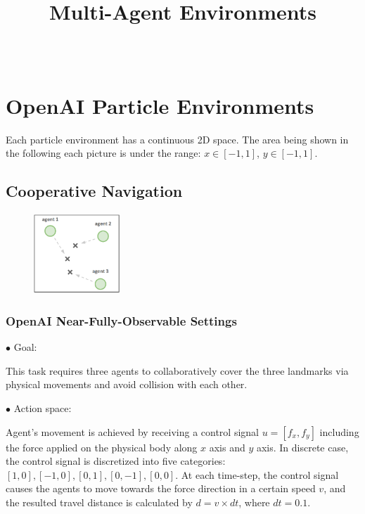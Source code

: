 \documentclass{article}
\title{Multi-Agent Environments}
\author{
     \\
}
\begin{document}
\maketitle


\section{OpenAI Particle Environments}

Each particle environment has a continuous 2D space. The area being shown in the following each picture is under the range: $x\in[-1,1]$, $y\in[-1,1]$. 

\subsection{Cooperative Navigation}

\begin{figure}[h!]
    \centering
    \includegraphics[height=3cm]{spread.png}
\end{figure}

\subsubsection{OpenAI Near-Fully-Observable Settings}

$\bullet$ Goal: 

This task requires three agents to collaboratively cover the three landmarks via physical movements and avoid collision with each other.

$\bullet$ Action space: 

Agent's movement is achieved by receiving a control signal $u=[f_x, f_y]$ including the force applied on the physical body along $x$ axis and $y$ axis. In discrete case, the control signal is discretized into five categories: $[1, 0], [-1, 0], [0,1], [0,-1],[0,0]$. At each time-step, the control signal causes the agents to move towards the force direction in a certain speed $v$, and the resulted travel distance is calculated by $d = v \times dt$, where $dt=0.1$.     
\end{document}
